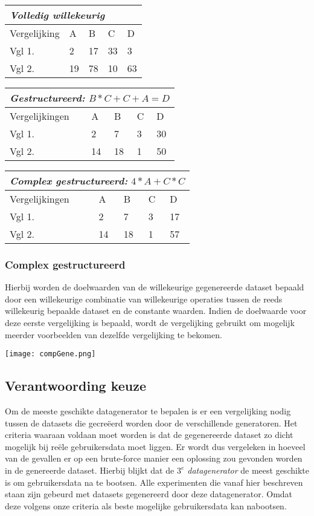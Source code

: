\documentclass[Main.tex]{subfiles}
\begin{document}
\begin{center}
\begin{tabular}{@{} *5l @{}}    \toprule
\multicolumn{5}{l}{\emph{Volledig willekeurig}}\\\midrule
 Vergelijking & A  & B  & C  & D  \\ 
 Vgl 1. & 2 & 17 & 33 & 3\\ 
 Vgl 2. & 19 & 78 & 10 & 63\\\bottomrule
 \hline
\end{tabular}

\begin{tabular}{@{} *5l @{}}    \toprule
\multicolumn{5}{l}{\emph{Gestructureerd: } $B*C+C+A = D$} \\ \midrule
 Vergelijkingen & A  & B  & C  & D  \\ 
 Vgl 1. & 2 & 7 & 3 & 30\\ 
 Vgl 2. & 14 & 18 & 1 & 50\\\bottomrule
 \hline
\end{tabular}

\begin{tabular}{@{} *5l @{}}    \toprule
\multicolumn{5}{l}{\emph{Complex gestructureerd:}  $4*A+C*C$}\\\midrule
 Vergelijkingen & A  & B  & C  & D  \\ 
 Vgl 1. & 2 & 7 & 3 & 17\\ 
 Vgl 2. & 14 & 18 & 1 & 57\\\bottomrule
 \hline
\end{tabular}
\end{center}

\subsubsection*{Complex gestructureerd}
Hierbij worden de doelwaarden van de willekeurige gegenereerde dataset bepaald door een willekeurige combinatie van willekeurige operaties tussen de reeds willekeurig bepaalde dataset en de constante waarden. Indien de doelwaarde voor deze eerste vergelijking is bepaald, wordt de vergelijking gebruikt om mogelijk meerder voorbeelden van dezelfde vergelijking te bekomen. 

\begin{center}
\texttt{[image: compGene.png]}
\end{center}

\subsection{Verantwoording keuze}
Om de meeste geschikte datagenerator te bepalen is er een vergelijking nodig tussen de datasets die gecre\"eerd worden door de verschillende generatoren. Het criteria waaraan voldaan moet worden is dat de gegenereerde dataset zo dicht mogelijk bij re\"ele gebruikersdata moet liggen. Er wordt dus vergeleken in hoeveel van de gevallen er op een brute-force manier een oplossing zou gevonden worden in de genereerde dataset. Hierbij blijkt dat de \textit{$3^{e}$ datagenerator} de meest geschikte is om gebruikersdata na te bootsen. Alle experimenten die vanaf hier beschreven staan zijn gebeurd met datasets gegenereerd door deze datagenerator. Omdat deze volgens onze criteria als beste mogelijke gebruikersdata kan nabootsen.
\end{document}
